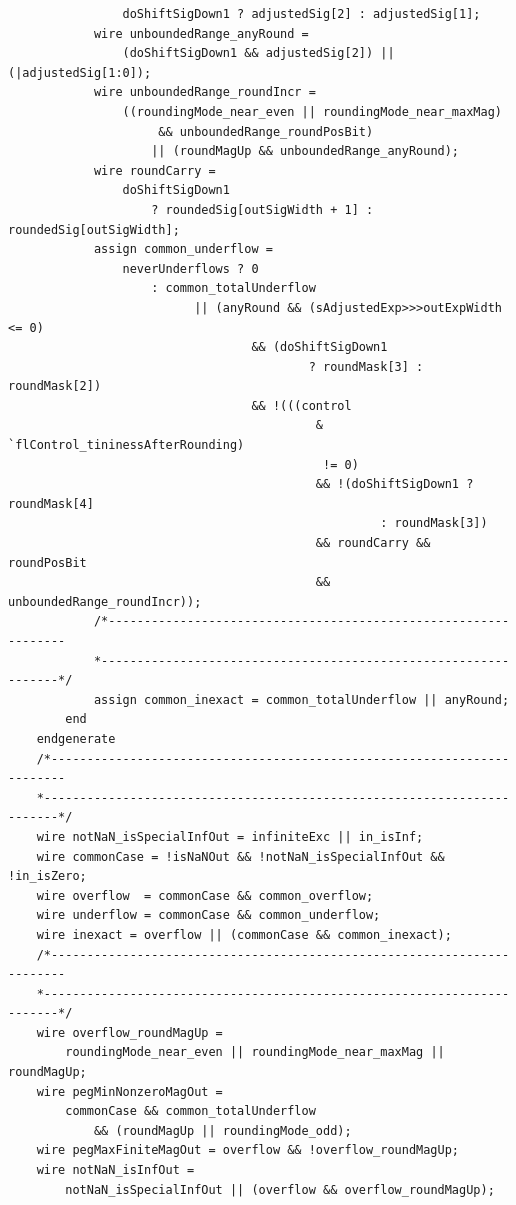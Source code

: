 \documentclass[12pt,letter]{article}
\begin{document}
\begin{lstlisting}
                doShiftSigDown1 ? adjustedSig[2] : adjustedSig[1];
            wire unboundedRange_anyRound =
                (doShiftSigDown1 && adjustedSig[2]) || (|adjustedSig[1:0]);
            wire unboundedRange_roundIncr =
                ((roundingMode_near_even || roundingMode_near_maxMag)
                     && unboundedRange_roundPosBit)
                    || (roundMagUp && unboundedRange_anyRound);
            wire roundCarry =
                doShiftSigDown1
                    ? roundedSig[outSigWidth + 1] : roundedSig[outSigWidth];
            assign common_underflow =
                neverUnderflows ? 0
                    : common_totalUnderflow
                          || (anyRound && (sAdjustedExp>>>outExpWidth <= 0)
                                  && (doShiftSigDown1
                                          ? roundMask[3] : roundMask[2])
                                  && !(((control
                                           & `flControl_tininessAfterRounding)
                                            != 0)
                                           && !(doShiftSigDown1 ? roundMask[4]
                                                    : roundMask[3])
                                           && roundCarry && roundPosBit
                                           && unboundedRange_roundIncr));
            /*----------------------------------------------------------------
            *----------------------------------------------------------------*/
            assign common_inexact = common_totalUnderflow || anyRound;
        end
    endgenerate
    /*------------------------------------------------------------------------
    *------------------------------------------------------------------------*/
    wire notNaN_isSpecialInfOut = infiniteExc || in_isInf;
    wire commonCase = !isNaNOut && !notNaN_isSpecialInfOut && !in_isZero;
    wire overflow  = commonCase && common_overflow;
    wire underflow = commonCase && common_underflow;
    wire inexact = overflow || (commonCase && common_inexact);
    /*------------------------------------------------------------------------
    *------------------------------------------------------------------------*/
    wire overflow_roundMagUp =
        roundingMode_near_even || roundingMode_near_maxMag || roundMagUp;
    wire pegMinNonzeroMagOut =
        commonCase && common_totalUnderflow
            && (roundMagUp || roundingMode_odd);
    wire pegMaxFiniteMagOut = overflow && !overflow_roundMagUp;
    wire notNaN_isInfOut =
        notNaN_isSpecialInfOut || (overflow && overflow_roundMagUp);

\end{lstlisting}
\end{document}

